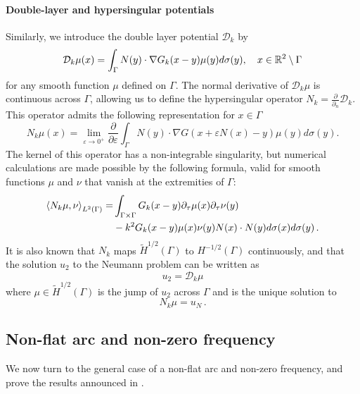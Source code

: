 \documentclass[a4paper]{article}
\begin{document}
\paragraph{Double-layer and hypersingular potentials}
Similarly, we introduce the double layer potential $\mathcal{D}_k$ by 
\[\mathcal{D}_k \mu(x) = \int_{\Gamma} N(y) \cdot \nabla G_k(x-y) \mu(y) d\sigma(y), \quad  x \in \mathbb{R}^2 \setminus \Gamma\]
for any smooth function $\mu$ defined on $\Gamma$.
The normal derivative of $\mathcal{D}_k\mu$ is continuous across $\Gamma$, allowing us to define the hypersingular operator $N_k = \frac{\partial}{\partial_n}\mathcal{D}_k$. This operator admits the following representation for $x\in \Gamma$
\begin{equation}
N_k \mu(x) = \lim_{\varepsilon \to 0^+} \frac{\partial}{\partial \varepsilon}\int_{\Gamma} N(y) \cdot \nabla G(x + \varepsilon N(x) - y) \mu(y) d\sigma(y).
\end{equation}
The kernel of this operator has a non-integrable singularity, but numerical calculations are made possible by the following formula, valid for smooth functions $\mu$ and $\nu$ that vanish at the extremities of $\Gamma$: 
\begin{equation}
	\begin{split}
		\left\langle N_k \mu,\nu\right\rangle_{L^2(\Gamma)} = &\int_{\Gamma\times \Gamma} G_k(x-y) \partial_\tau \mu(x) \partial_\tau \nu(y)\\
		& - k^2 G_k(x-y) \mu(x) \nu(y)N(x) \cdot N(y) d\sigma(x) d\sigma(y)\,.
	\end{split}
\end{equation}
It is also known that $N_k$ maps $\tilde{H}^{1/2}(\Gamma)$ to $H^{-1/2}(\Gamma)$ continuously, and that the solution $u_2$ to the Neumann problem can be written as
\begin{equation}
u_2 = \mathcal{D}_k \mu
\end{equation}
where $\mu \in \tilde{H}^{1/2}(\Gamma)$ is the jump of $u_2$ across $\Gamma$ and is the unique solution to
\begin{equation}
N_k \mu = u_N\,.
\label{Nkmu}
\end{equation}  


\subsection{Non-flat arc and non-zero frequency}

We now turn to the general case of a non-flat arc and non-zero frequency, and prove the results announced in \cite{alouges2018new}.
\end{document}
